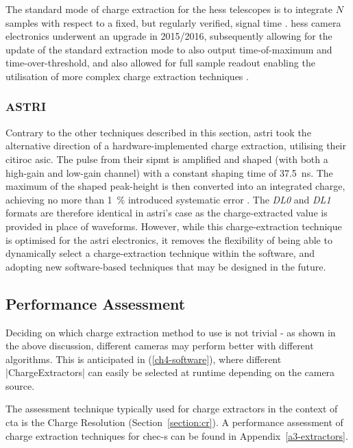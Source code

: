 The standard mode of charge extraction for the \gls{hess} telescopes is to integrate $N$ samples with respect to a fixed, but regularly verified, signal time \cite{Aharonian2004}. \gls{hess} camera electronics underwent an upgrade in 2015/2016, subsequently allowing for the update of the standard extraction mode to also output time-of-maximum and time-over-threshold, and also allowed for full sample readout enabling the utilisation of more complex charge extraction techniques \cite{Klepser2017}\cite{Chalme-Calvet2015}.

\subsubsection{ASTRI}

Contrary to the other techniques described in this section, \gls{astri} took the alternative direction of a hardware-implemented charge extraction, utilising their \gls{citiroc} \gls{asic}. The pulse from their \gls{sipmt} is amplified and shaped (with both a high-gain and low-gain channel) with a constant shaping time of \SI{37.5}{ns}. The maximum of the shaped peak-height is then converted into an integrated charge, achieving no more than \SI{1}{\percent} introduced systematic error \cite{Impiombato2017}. The \textit{DL0} and \textit{DL1} formats are therefore identical in \gls{astri}'s case as the charge-extracted value is provided in place of waveforms. However, while this charge-extraction technique is optimised for the \gls{astri} electronics, it removes the flexibility of being able to dynamically select a charge-extraction technique within the software, and adopting new software-based techniques that may be designed in the future.

\subsection{Performance Assessment}

Deciding on which charge extraction method to use is not trivial - as shown in the above discussion, different cameras may perform better with different algorithms. This is anticipated in  (\ref{ch4-software}), where different |ChargeExtractors| can easily be selected at runtime depending on the camera source.

The assessment technique typically used for charge extractors in the context of \gls{cta} is the Charge Resolution (Section~\ref{section:cr}). A performance assessment of charge extraction techniques for \gls{chec-s} can be found in Appendix~\ref{a3-extractors}.

